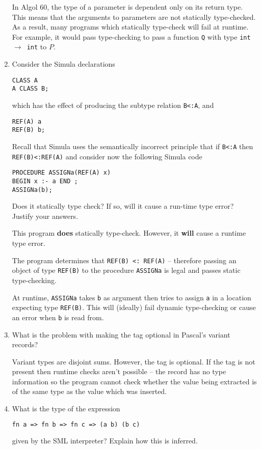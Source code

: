 \documentclass[10pt,\jkfside,a4paper]{article}
\begin{document}
\begin{enumerate}
In Algol 60, the type of a parameter is dependent only on its return type.
This means that the arguments to parameters are not statically type-checked.
As a result, many programs which statically type-check will fail at runtime.
For example, it would pass type-checking to pass a function \texttt{Q} with
type \texttt{int $\to$ int} to $P$.

\item Consider the Simula declarations
\begin{lstlisting}[language=Simula]
CLASS A
A CLASS B;
\end{lstlisting}
which has the effect of producing the subtype relation \texttt{B<:A}, and
\begin{lstlisting}[language=Simula]
REF(A) a
REF(B) b;
\end{lstlisting}
Recall that Simula uses the semantically incorrect principle that if
\texttt{B<:A} then \texttt{REF(B)<:REF(A)} and consider now the following
Simula code
\begin{lstlisting}[language=Simula]
PROCEDURE ASSIGNa(REF(A) x)
BEGIN x :- a END ;
ASSIGNa(b);
\end{lstlisting}
Does it statically type check? If so, will it cause a run-time type error?
Justify your answers.

This program \textbf{does} statically type-check. However, it \textbf{will}
cause a runtime type error.

The program determines that \texttt{REF(B) <: REF(A)} -- therefore passing
an object of type \texttt{REF(B)} to the procedure \texttt{ASSIGNa} is legal
and passes static type-checking.

At runtime, \texttt{ASSIGNa} takes \texttt{b} as argument then tries to
assign \texttt{a} in a location expecting type \texttt{REF(B)}. This will
(ideally) fail dynamic type-checking or cause an error when \texttt{b} is
read from.

\item What is the problem with making the tag optional in Pascal's variant
records?

Variant types are disjoint sums. However, the tag is optional. If the tag is
not present then runtime checks aren't possible -- the record has no type
information so the program cannot check whether the value being extracted is
of the same type as the value which was inserted.

\item What is the type of the expression
\begin{lstlisting}[language=ML]
fn a => fn b => fn c => (a b) (b c)
\end{lstlisting}
given by the SML interpreter? Explain how this is inferred.


\end{enumerate}
\end{document}

